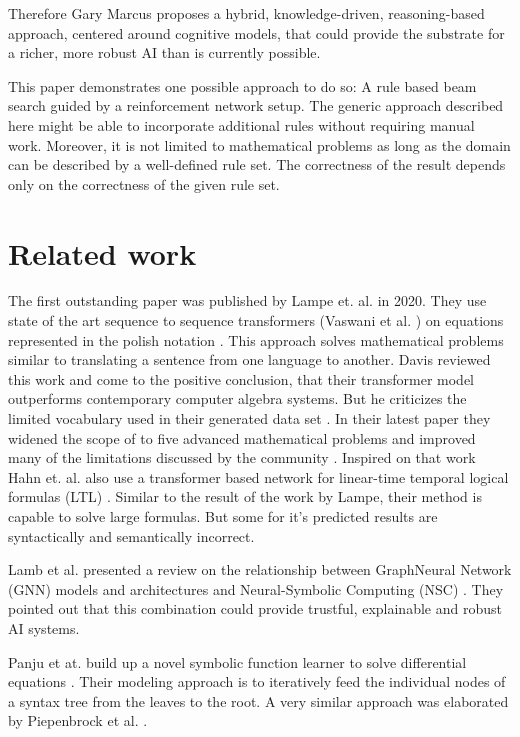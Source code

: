 \documentclass{scrartcl}
\theoremstyle{definition}
\begin{document}
Therefore Gary Marcus proposes a hybrid, knowledge-driven, reasoning-based approach, centered around cognitive models,
that could provide the substrate for a richer, more robust AI than is currently possible. \cite{marcus2020decade}

This paper demonstrates one possible approach to do so:
A rule based beam search guided by a reinforcement network setup.
The generic approach described here might be able to incorporate additional rules without requiring manual work.
Moreover, it is not limited to mathematical problems as long as the domain can be described by a well-defined rule set.
The correctness of the result depends only on the correctness of the given rule set.

\section{Related work}

The first outstanding paper was published by Lampe et. al. in 2020.
They use state of the art sequence to sequence transformers (Vaswani et al. \cite{vaswani2017attention}) on equations represented in the polish notation \cite{Lample2020Deep}.
This approach solves mathematical problems similar to translating a sentence from one language to another. 
Davis reviewed this work and come to the positive conclusion, that their transformer model outperforms contemporary computer algebra systems.
But he criticizes the limited vocabulary used in their generated data set \cite{davis2019use}.
In their latest paper they widened the scope of to five advanced mathematical problems and improved many of the limitations discussed by the community \cite{charton2021learning}.
Inspired on that work Hahn et. al. also use a transformer based network for linear-time temporal logical formulas (LTL) \cite{hahn2021teaching}.
Similar to the result of the work by Lampe, their method is capable to solve large formulas.
But some for it's predicted results are syntactically and semantically incorrect.

Lamb et al. presented a review on the relationship between GraphNeural Network (GNN) models and architectures and Neural-Symbolic Computing (NSC) \cite{lamb2020graph}.
They pointed out that this combination could provide trustful, explainable and robust AI systems.

Panju et at. build up a novel symbolic function learner to solve differential equations \cite{panju2020neurosymbolic}.
Their modeling approach is to iteratively feed the individual nodes of a syntax tree from the leaves to the root.
A very similar approach was elaborated by Piepenbrock et al. \cite{piepenbrock2021learning}. 
\end{document}
